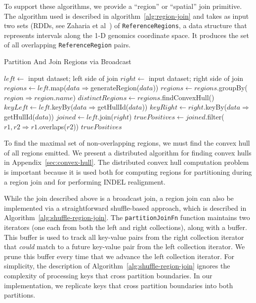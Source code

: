\documentclass{sig-alternate}
\begin{document}
To support these algorithms, we provide a ``region'' or ``spatial'' join primitive. The algorithm used is described
in algorithm~\ref{alg:region-join} and takes as input two sets (RDDs, see Zaharia et al~\cite{zaharia12}) of
\texttt{ReferenceRegions}, a data structure that represents intervals along the 1-D genomics coordinate
space. It produces the set of all overlapping \texttt{ReferenceRegion} pairs.

\begin{algorithm}
\caption{Partition And Join Regions via Broadcast}
\label{alg:region-join}
\begin{algorithmic}
\STATE $left \leftarrow$ input dataset; left side of join
\STATE $right \leftarrow$ input dataset; right side of join
\STATE $regions \leftarrow left$.map($data \Rightarrow $generateRegion($data$))
\STATE $regions \leftarrow regions$.groupBy($region \Rightarrow region$.$name$)
\STATE $distinctRegions \leftarrow regions$.findConvexHull()
\STATE $keyLeft \leftarrow left$.keyBy($data \Rightarrow $getHullId($data$))
\STATE $keyRight \leftarrow right$.keyBy($data \Rightarrow $getHullId($data$))
\STATE $joined \leftarrow left$.join($right$)
\STATE $truePositives \leftarrow joined$.filter($r1, r2 \Rightarrow r1$.overlaps($r2$))
\RETURN $truePositives$
\end{algorithmic}
\end{algorithm}

To find the maximal set of non-overlapping regions, we must find the convex hull of all regions emitted.
We present a distributed algorithm for finding convex hulls in Appendix~\ref{sec:convex-hull}. The
distributed convex hull computation problem is important because it is used both for computing regions
for partitioning during a region join and for performing INDEL realignment.

While the join described above is a broadcast join, a region join can also be implemented via a straightforward
shuffle-based approach, which is described in Algorithm~\ref{alg:shuffle-region-join}. The \texttt{partitionJoinFn}
function maintains two iterators (one each from both the left and right collections), along with a buffer. This buffer is
used to track all key-value pairs from the right collection iterator that \emph{could} match to a future key-value pair
from the left collection iterator. We prune this buffer every time that we advance the left collection iterator. For
simplicity, the description of Algorithm~\ref{alg:shuffle-region-join} ignores the complexity of processing keys that cross
partition boundaries. In our implementation, we replicate keys that cross partition boundaries into both partitions.
\end{document}
